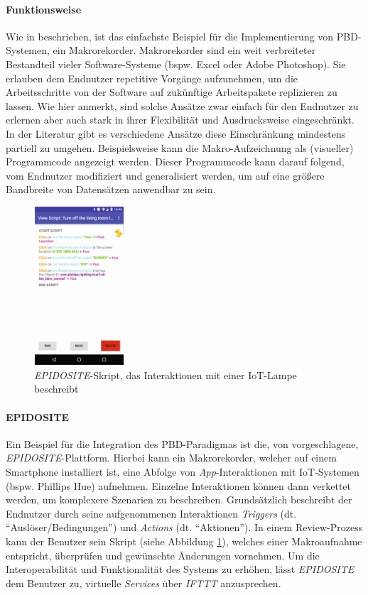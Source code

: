 \paragraph{Funktionsweise} Wie in \cite{cypher1993pbd} beschrieben, ist das einfachste Beispiel für die Implementierung von \ac{PBD}-Systemen, ein Makrorekorder. Makrorekorder sind ein weit verbreiteter Bestandteil vieler Software-Systeme (bspw. Excel oder Adobe Photoshop). Sie erlauben dem Endnutzer repetitive Vorgänge aufzunehmen, um die Arbeitsschritte von der Software auf zukünftige Arbeitspakete replizieren zu lassen. Wie \cite{cypher1993pbd} hier anmerkt, sind solche Ansätze zwar einfach für den Endnutzer zu erlernen aber auch stark in ihrer Flexibilität und Ausdrucksweise eingeschränkt. In der Literatur gibt es verschiedene Ansätze diese Einschränkung mindestens partiell zu umgehen. Beispielsweise kann die Makro-Aufzeichnung als (visueller) Programmcode angezeigt werden. Dieser Programmcode kann darauf folgend, vom Endnutzer modifiziert und generalisiert werden, um auf eine größere Bandbreite von Datensätzen anwendbar zu sein.

\begin{figure}[h]
    \centering
    \includegraphics[width=0.3\textwidth]{bilder/chapter2/epidosite__example.png}
    \caption{\textit{EPIDOSITE}-Skript, das Interaktionen mit einer \ac{IoT}-Lampe beschreibt}
    \label{fig:epidositeexample}
\end{figure}

\paragraph{EPIDOSITE} Ein Beispiel für die Integration des \ac{PBD}-Paradigmas ist die, von \cite{li2017programming} vorgeschlagene, \textit{EPIDOSITE}-Plattform. Hierbei kann ein Makrorekorder, welcher auf einem Smartphone installiert ist, eine Abfolge von \textit{App}-Interaktionen mit IoT-Systemen (bspw. Phillips Hue) aufnehmen. Einzelne Interaktionen können dann verkettet werden, um komplexere Szenarien zu beschreiben. Grundsätzlich beschreibt der Endnutzer durch seine aufgenommenen Interaktionen \textit{Triggers} (dt. "`Auslöser/Bedingungen"') und \textit{Actions} (dt. "`Aktionen"'). In einem Review-Prozess kann der Benutzer sein Skript (siehe Abbildung \ref{fig:epidositeexample}), welches einer Makroaufnahme entspricht, überprüfen und gewünschte Änderungen vornehmen. Um die Interoperabilität und Funktionalität des Systems zu erhöhen, lässt \textit{EPIDOSITE} dem Benutzer zu, virtuelle \textit{Services} über \textit{IFTTT} anzusprechen. 

